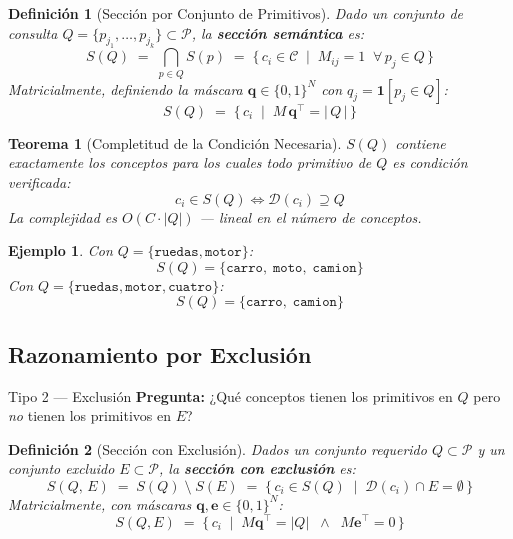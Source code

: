 \documentclass[12pt]{article}
\newtheorem{theorem}{Teorema}[section]
\newtheorem{definition}{Definición}[section]
\newtheorem{example}{Ejemplo}[section]
\begin{document}
\begin{definition}[Sección por Conjunto de Primitivos]
	Dado un conjunto de consulta $Q = \{p_{j_1}, \ldots, p_{j_k}\} \subset \mathcal{P}$,
	la \textbf{sección semántica} es:
	\[
	S(Q) \;=\; \bigcap_{p \in Q} S(p)
	\;=\; \bigl\{\,c_i \in \mathcal{C}
	\;\mid\; M_{ij} = 1\;\;\forall\, p_j \in Q\,\bigr\}
	\]
	Matricialmente, definiendo la máscara $\mathbf{q} \in \{0,1\}^N$ con
	$q_j = \mathbf{1}[p_j \in Q]$:
	\[
	S(Q) \;=\; \bigl\{\,c_i \;\mid\; M\,\mathbf{q}^\top = |\,Q\,|\,\bigr\}
	\]
\end{definition}

\begin{theorem}[Completitud de la Condición Necesaria]
	$S(Q)$ contiene exactamente los conceptos para los cuales todo primitivo de $Q$
	es condición verificada:
	\[
	c_i \in S(Q) \iff \mathcal{D}(c_i) \supseteq Q
	\]
	La complejidad es $O(C \cdot |Q|)$ — lineal en el número de conceptos.
\end{theorem}

\begin{example}
	Con $Q = \{\texttt{ruedas},\texttt{motor}\}$:
	\[
	S(Q) = \{\texttt{carro},\;\texttt{moto},\;\texttt{camion}\}
	\]
	Con $Q = \{\texttt{ruedas},\texttt{motor},\texttt{cuatro}\}$:
	\[
	S(Q) = \{\texttt{carro},\;\texttt{camion}\}
	\]
\end{example}

\subsection{Razonamiento por Exclusión}

\begin{razonbox}{Tipo 2 — Exclusión}
	\textbf{Pregunta:} ¿Qué conceptos tienen los primitivos en $Q$ pero \emph{no}
	tienen los primitivos en $E$?
\end{razonbox}

\begin{definition}[Sección con Exclusión]
	Dados un conjunto requerido $Q \subset \mathcal{P}$ y un conjunto excluido
	$E \subset \mathcal{P}$, la \textbf{sección con exclusión} es:
	\[
	S(Q,\,E) \;=\; S(Q) \;\setminus\; S(E)
	\;=\; \bigl\{\,c_i \in S(Q)
	\;\mid\; \mathcal{D}(c_i) \cap E = \emptyset\,\bigr\}
	\]
	Matricialmente, con máscaras $\mathbf{q},\mathbf{e} \in \{0,1\}^N$:
	\[
	S(Q,E) \;=\; \bigl\{\,c_i
	\;\mid\; M\mathbf{q}^\top = |Q|
	\;\;\wedge\;\;
	M\mathbf{e}^\top = 0\,\bigr\}
	\]
\end{definition}
\end{document}
